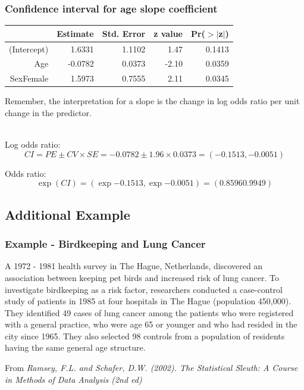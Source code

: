 

\begin{frame}
\frametitle{Confidence interval for age slope coefficient}

\begin{center}
\begin{tabular}{rrrrr}
  \hline
 & Estimate & Std. Error & z value & Pr($>$$|$z$|$) \\ 
  \hline
(Intercept) & 1.6331 & 1.1102 & 1.47 & 0.1413 \\ 
  Age & -0.0782 & 0.0373 & -2.10 & 0.0359 \\ 
  SexFemale & 1.5973 & 0.7555 & 2.11 & 0.0345 \\ 
   \hline
\end{tabular}
\end{center}

Remember, the interpretation for a slope is the change in log odds ratio per unit change in the predictor.\\
~\\

\pause

Log odds ratio:
\[ CI = PE \pm CV \times SE = -0.0782 \pm 1.96 \times 0.0373 = (-0.1513,  -0.0051) \]

\pause

Odds ratio:
\[ \exp(CI) = (\exp{-0.1513}, \exp{-0.0051}) = (0.8596 0.9949) \]


\end{frame}



\subsection{Additional Example}



\begin{frame}
\frametitle{Example - Birdkeeping and Lung Cancer}

A 1972 - 1981 health survey in The Hague, Netherlands, discovered an association between keeping pet birds and increased risk of lung cancer. To investigate birdkeeping as a risk factor, researchers conducted a case-control study of patients in 1985 at four hospitals in The Hague (population 450,000). They identified 49 cases of lung cancer among the patients who were registered with a general practice, who were age 65 or younger and who had resided in the city since 1965. They also selected 98 controls from a population of residents having the same general age structure.


\vfill

{\tiny From \textit{Ramsey, F.L. and Schafer, D.W. (2002). The Statistical Sleuth: A Course in Methods of Data Analysis (2nd ed)}}
\end{frame}

